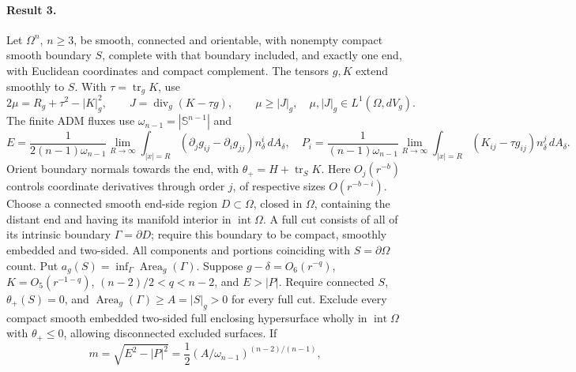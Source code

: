 \documentclass[11pt]{article}
\begin{document}
\paragraph{Result 3.} Let $\Omega^n$, $n\ge3$, be smooth, connected and orientable, with nonempty compact smooth boundary $S$, complete with that boundary included, and exactly one end, with Euclidean coordinates and compact complement. The tensors $g,K$ extend smoothly to $S$. With $\tau=\operatorname{tr}_gK$, use
\[
 2\mu=R_g+\tau^2-|K|_g^2,\qquad J=\operatorname{div}_g(K-\tau g),\qquad
 \mu\ge|J|_g,\quad\mu,|J|_g\in L^1(\Omega,dV_g).
\]
The finite ADM fluxes use $\omega_{n-1}=|\mathbb S^{n-1}|$ and
\[
 E=\frac1{2(n-1)\omega_{n-1}}\lim_{R\to\infty}\int_{|x|=R}
 (\partial_jg_{ij}-\partial_ig_{jj})n_\delta^i\,dA_\delta,\quad
 P_i=\frac1{(n-1)\omega_{n-1}}\lim_{R\to\infty}\int_{|x|=R}(K_{ij}-\tau g_{ij})n_\delta^j\,dA_\delta.
\]
Orient boundary normals towards the end, with $\theta_+=H+\operatorname{tr}_SK$. Here $O_j(r^{-b})$ controls coordinate derivatives through order $j$, of respective sizes $O(r^{-b-i})$. Choose a connected smooth end-side region $D\subset\Omega$, closed in $\Omega$, containing the distant end and having its manifold interior in $\operatorname{int}\Omega$. A full cut consists of all of its intrinsic boundary $\Gamma=\partial D$; require this boundary to be compact, smoothly embedded and two-sided. All components and portions coinciding with $S=\partial\Omega$ count. Put $a_g(S)=\inf_\Gamma\operatorname{Area}_g(\Gamma)$. Suppose $g-\delta=O_6(r^{-q})$, $K=O_5(r^{-1-q})$, $(n-2)/2<q<n-2$, and $E>|P|$. Require connected $S$, $\theta_+(S)=0$, and $\operatorname{Area}_g(\Gamma)\ge A=|S|_g>0$ for every full cut. Exclude every compact smooth embedded two-sided full enclosing hypersurface wholly in $\operatorname{int}\Omega$ with $\theta_+\le0$, allowing disconnected excluded surfaces. If
\[
 m=\sqrt{E^2-|P|^2}=\frac12(A/\omega_{n-1})^{(n-2)/(n-1)},
\]
\end{document}
